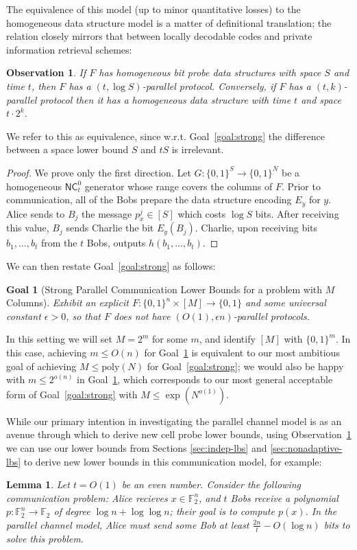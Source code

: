 \documentclass[11pt]{article}
\newtheorem{lemma}{Lemma}
\newtheorem{observation}{Observation}
\newtheorem{goal}{Goal}
\newcommand{\B}{\{0,1\}}
\newcommand{\poly}{\mathrm{poly}}
\begin{document}
The equivalence of this model (up to minor quantitative losses) to the homogeneous data structure model is a matter of definitional translation; the relation closely mirrors that between locally decodable codes and private information retrieval schemes:
\begin{observation}\label{obs:parallel-channel}
If $F$ has homogeneous bit probe data structures with space $S$ and time $t$, then $F$ has a $(t,\log S)$-parallel protocol. Conversely, if $F$ has a $(t,k)$-parallel protocol then it has a homogeneous data structure with time $t$ and space $t\cdot 2^k$.
\end{observation}
We refer to this as equivalence, since w.r.t. Goal~\ref{goal:strong} the difference between a space lower bound $S$ and $tS$ is irrelevant. 
\begin{proof}
We prove only the first direction. Let $G: \B^S \to \B^N$ be a homogeneous $\mathsf{NC}^0_t$ generator whose range covers the columns of $F$. Prior to communication, all of the Bobs prepare the data structure encoding $E_y$ for $y$. Alice sends to $B_j$ the message $p_x^j\in [S]$ which costs $\log S$ bits. After receiving this value, $B_j$ sends Charlie the bit $E_y(B_j)$. Charlie, upon receiving bits $b_1,\ldots,b_t$ from the $t$ Bobs, outputs $h(b_1,\ldots,b_t)$.
\end{proof}
We can then restate Goal~\ref{goal:strong} as follows:
\begin{goal}[Strong Parallel Communication Lower Bounds for a problem with $M$ Columns]\label{goal:equiv}
Exhibit an explicit $F: \B^n \times [M] \to \B$ and some universal constant $\epsilon>0$, so that $F$ does not have $(O(1),\epsilon n)$-parallel protocols.
\end{goal}
In this setting we will set $M = 2^m$ for some $m$, and identify $[M]$ with $\B^m$. In this case, achieving $m \leq O(n)$ for Goal~\ref{goal:equiv} is equivalent to our most ambitious goal of achieving $M \leq \poly(N)$ for Goal~\ref{goal:strong}; we would also be happy with $m \leq 2^{o(n)}$ in Goal~\ref{goal:equiv}, which corresponds to our most general acceptable form of Goal~\ref{goal:strong} with $M \leq \exp(N^{o(1)})$.

While our primary intention in investigating the parallel channel model is as an avenue through which to derive new cell probe lower bounds, using Observation~\ref{obs:parallel-channel} we can use our lower bounds from Sections \ref{sec:indep-lbs} and \ref{sec:nonadaptive-lbs} to derive new lower bounds in this communication model, for example:
\begin{lemma}
Let $t= O(1)$ be an even number. Consider the following communication problem: Alice recieves $x \in \mathbb{F}_2^n$, and $t$ Bobs receive a polynomial $p:\mathbb{F}_2^n \to \mathbb{F}_2$ of degree $\log n + \log\log n$; their goal is to compute $p(x)$. In the parallel channel model, Alice must send some Bob at least $\frac{2n}{t} - O(\log n)$ bits to solve this problem.
\end{lemma}
\end{document}
